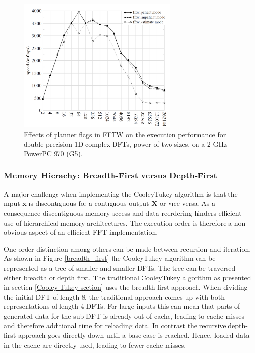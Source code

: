 \documentclass{usiinftr}
\begin{document}
\begin{figure}[h] 
\centering
\includegraphics[width=0.7\textwidth]{figures/Plans_Performance.png}
\caption{Effects of planner flags in FFTW on the execution performance for double-precision 1D complex DFTs, power-of-two sizes, on a 2 GHz PowerPC 970 (G5)\cite{FFTW05}.}
\label{Planner flags}
\end{figure}

\subsubsection{Memory Hierachy: Breadth-First versus Depth-First}
A major challenge when implementing the Cooley\textendash Tukey algorithm is that the input $\textbf{x}$ is discontiguous for a contiguous output $\textbf{X}$ or vice versa.
As a consequence discontiguous memory access and data reordering hinders efficient use of hierarchical  memory architectures.
The execution order is therefore a non obvious aspect of an efficient FFT implementation.

One order distinction among others can be made between recursion and iteration.
As shown in Figure \ref{breadth_first} the Cooley\textendash Tukey algorithm can be represented as a tree of smaller and smaller DFTs.
The tree can be traversed either breadth or depth first.
The traditional Cooley\textendash Tukey algorithm as presented in section \ref{Cooley Tukey section} uses the breadth-first approach.
When dividing the initial DFT of length 8, the traditional approach comes up with both representations of length-4 DFTs.
For large inputs this can mean that parts of generated data for the sub-DFT is already out of cache, leading to cache misses and therefore additional time for reloading data.
In contrast the recursive depth-first approach goes directly down until a base case is reached.
Hence, loaded data in the cache are directly used, leading to fewer cache misses.
\end{document}
